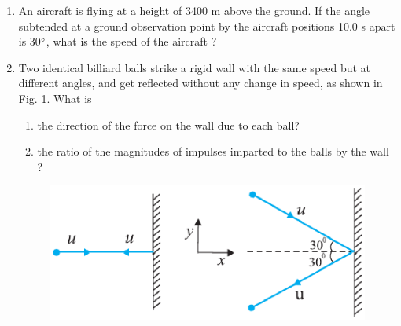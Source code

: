\begin{enumerate}[label=\arabic*.,ref=\thesubsection.\theenumi]
\begin{enumerate}
\end{enumerate}
\item An aircraft is flying at a height of 3400 m above the ground. If the angle subtended at a ground observation point by the aircraft positions 10.0 s apart is 30$\degree$, what is the speed of the aircraft ?
\item Two identical billiard balls strike a rigid wall with the same speed but at different angles, and get reflected without any change in speed, as shown in Fig. \ref{fig:5.6}. What is 
\begin{enumerate}
\item  the direction of the force on the wall due to each ball? 
\item the ratio of the magnitudes of impulses imparted to the balls by the wall ?
\end{enumerate}
\begin{figure}[!ht]
\centering
\includegraphics[width=\columnwidth]{./figs/11-1/5/5.6.eps}
\caption{}
\label{fig:5.6}
\end{figure} 


\end{enumerate}
